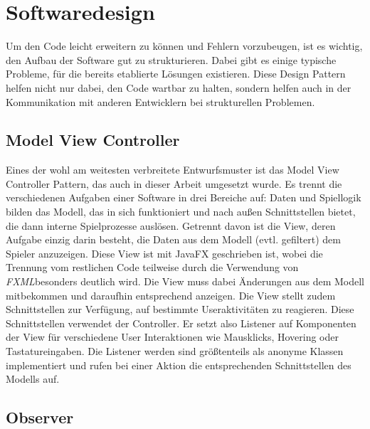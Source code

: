 \section{Softwaredesign} %
\label{sec:softwaredesign}

Um den Code leicht erweitern zu können und Fehlern vorzubeugen, ist es wichtig, den Aufbau der Software gut zu strukturieren. Dabei gibt es einige typische Probleme, für die bereits etablierte Lösungen existieren. Diese Design Pattern helfen nicht nur dabei, den Code wartbar zu halten, sondern helfen auch in der Kommunikation mit anderen Entwicklern bei strukturellen Problemen.

\subsection{Model View Controller} %
\label{sub:model_view_controller}
Eines der wohl am weitesten verbreitete Entwurfsmuster ist das Model View Controller Pattern, das auch in dieser Arbeit umgesetzt wurde. Es trennt die verschiedenen Aufgaben einer Software in drei Bereiche auf: Daten und Spiellogik bilden das Modell, das in sich funktioniert und nach außen Schnittstellen bietet, die dann interne Spielprozesse auslösen. Getrennt davon ist die View, deren Aufgabe einzig darin besteht, die Daten aus dem Modell (evtl. gefiltert) dem Spieler anzuzeigen. Diese View ist mit JavaFX geschrieben ist, wobei die Trennung vom restlichen Code teilweise durch die Verwendung von \emph{FXML}besonders deutlich wird. Die View muss dabei Änderungen aus dem Modell mitbekommen und daraufhin entsprechend anzeigen. Die View stellt zudem Schnittstellen zur Verfügung, auf bestimmte Useraktivitäten zu reagieren. Diese Schnittstellen verwendet der Controller. Er setzt also Listener auf Komponenten der View für verschiedene User Interaktionen wie Mausklicks, Hovering oder Tastatureingaben. Die Listener werden sind größtenteils als anonyme Klassen implementiert und rufen bei einer Aktion die entsprechenden Schnittstellen des Modells auf.  

\subsection{Observer} %
\label{sub:observer}


